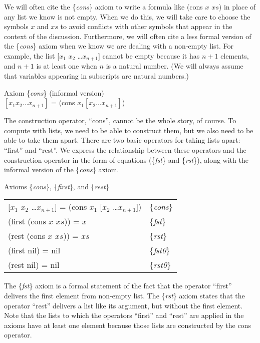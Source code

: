 We will often cite the \{\emph{cons}\} axiom to write
a formula like (cons $x$ $xs$) in place of any list we know is not empty.
When we do this, we will take care to choose the symbols $x$ and $xs$
to avoid conflicts with other symbols that appear in the context of the discussion.
Furthermore, we will often cite a less formal version of the \{\emph{cons}\} axiom
when we know we are dealing with a non-empty list.
For example, the list [$x_1$ $x_2$ \dots $x_{n+1}$]
cannot be empty because it has $n+1$ elements, and $n+1$
is at least one when $n$ is a natural number.
(We will always assume that variables appearing in subscripts are natural numbers.)
\begin{samepage}
\begin{center}
\label{cons-axiom-informal}
Axiom \{\emph{cons}\} (informal version) \\
$[x_1 x_2 \dots x_{n+1}]$ = (cons $x_1 [x_2 \dots x_{n+1}]$)
\end{center}
\end{samepage}

The construction operator, ``cons'', cannot be the whole story, of course.
To compute with lists, we  need to be able to construct them,
but we also need to be able to take them apart.
There are two basic operators for taking lists apart: ``first'' and ``rest''.
We express the relationship between these operators and
the construction operator in the form of equations
(\{\emph{fst}\} and \{\emph{rst}\}),
along with the informal version of the \{\emph{cons}\} axiom.
\begin{samepage}
\label{first-rest-cons}
\begin{center}
 Axioms \{\emph{cons}\}, \{\emph{first}\}, and \{\emph{rest}\} \\
\begin{tabular}{ll}
 [$x_1$ $x_2$ \dots $x_{n+1}$] = (cons $x_1$ [$x_2$ \dots $x_{n+1}$]) & \{\emph{cons}\} \\
 (first (cons $x$ $xs$)) = $x$                                        & \{\emph{fst}\}\\
 (rest (cons $x$ $xs$))  = $xs$                                       & \{\emph{rst}\} \\
 (first nil) = nil                                                    & \{\emph{fst0}\}\\
 (rest nil) = nil                                                     & \{\emph{rst0}\}
\end{tabular}
\end{center}
\end{samepage}
The \{\emph{fst}\} axiom is a formal statement of the fact that
the operator ``first'' delivers the first element from non-empty list.
The \{\emph{rst}\} axiom states that the operator ``rest'' delivers
a list like its argument, but without the first element.
Note that the lists to which the operators ``first'' and ``rest''
are applied in the axioms have at least one element
because those lists are constructed by the cons operator.

